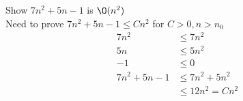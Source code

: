 \documentclass[11pt]{article}
\begin{document}
Show $7n^2 + 5n -1$ is $\O(n^2)$\\
Need to prove $7n^2 + 5n -1 \leq Cn^2$ for $C>0, n>n_0$\\
\begin{align*}
7n^2 &\leq 7n^2\\
5n &\leq 5n^2 \tag{if $n \geq 1$} \\
-1 &\leq 0 \\
7n^2 + 5n -1 &\leq 7n^2 + 5n^2 \\
&\leq 12n^2 = Cn^2\\
\end{align*}
\end{document}
